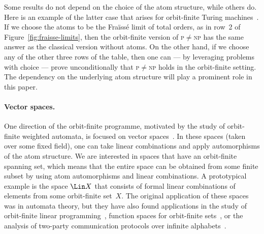 Some results do not depend on the choice of the atom structure, while others do. 
Here is an example of the latter case that arises for orbit-finite Turing machines~\cite{bojanczykTuringMachinesAtoms2013}. 
If we choose the atoms to be the Fraïssé limit of total orders, as in row~2 of Figure~\ref{fig:fraisse-limits}, then the orbit-finite version of \textsc{p}$\neq$\textsc{np} has the same answer as the classical version without atoms. 
On the other hand, if we choose any of the other three rows of the table, then one can --- by leveraging problems with choice --- prove unconditionally that \textsc{p}$\neq$\textsc{np} holds in the orbit-finite setting. 
The dependency on the underlying atom structure will play a prominent role in this paper. 


\paragraph*{Vector spaces.}
One direction of the orbit-finite programme, motivated by the study of orbit-finite weighted automata, is focused on vector spaces~\cite{BFKM24}. 
In these spaces (taken over some fixed field), one can take linear combinations and apply automorphisms of the atom structure. 
We are interested in spaces that have an orbit-finite spanning set, which means that the entire space can be obtained from some finite subset by using atom automorphisms and linear combinations.
A prototypical example is the space $\Lin X$ that consists of formal linear combinations of elements from some orbit-finite set~$X$. 
The original application of these spaces was in automata theory, but they have also found applications in the study of  orbit-finite linear programming~\cite{ghosh2023orbit}, function spaces for orbit-finite sets~\cite{functionSpaces2024}, or  the analysis of two-party communication protocols over infinite alphabets~\cite{aliceBob}.

